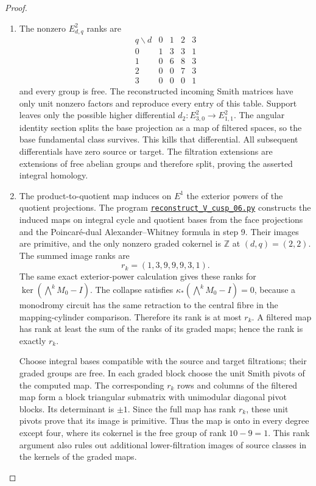 \begin{proof}
\begin{enumerate}[label={$\langle1\rangle$\arabic*.}]
\item The nonzero $E^2_{d,q}$ ranks are
\[
\begin{array}{c|rrrr}
q\backslash d&0&1&2&3\\\hline
0&1&3&3&1\\
1&0&6&8&3\\
2&0&0&7&3\\
3&0&0&0&1
\end{array}
\]
and every group is free. The reconstructed incoming Smith matrices
have only unit nonzero factors and reproduce every entry of this table.
Support leaves only the possible higher differential
$d_2:E^2_{3,0}\to E^2_{1,1}$.
The angular identity section splits the base projection as a map of
filtered spaces, so the base fundamental class survives.  This kills
that differential.  All subsequent differentials have zero source or
target.  The filtration extensions are extensions of free abelian
groups and therefore split, proving the asserted integral homology.

\item The product-to-quotient map induces on $E^1$ the exterior powers of
the quotient projections.  The program \href{https://github.com/KokunoYumeto/s6-complex-structure-workbench/blob/83d76022bcd442278b760db9ff438afceed6c6ea/pro_returns/S6_SERIES_GRIND_checkpoint_10_20261120T0211Z/code/current_audits/audit_corrections/code/reconstruct_V_cusp_06.py}{\texttt{reconstruct\_V\_cusp\_06.py}} constructs the induced maps
on integral cycle and quotient bases from the face projections and the
Poincar\'e-dual Alexander--Whitney formula in step 9. Their images are primitive, and the only nonzero graded cokernel
is $\mathbb Z$ at $(d,q)=(2,2)$.  The summed image ranks are
\[
             r_k=(1,3,9,9,9,3,1).
\]
The same exact exterior-power calculation gives these ranks for
$\ker(\bigwedge^kM_0-I)$.
The collapse satisfies
$\kappa_*(\bigwedge^kM_0-I)=0$, because a monodromy circuit
has the same retraction to the central fibre in the mapping-cylinder
comparison.  Therefore its rank is at most $r_k$.
A filtered map has rank at least the sum of the ranks of its
graded maps; hence the rank is exactly $r_k$.

Choose integral bases compatible with the source and target
filtrations; their graded groups are free.  In each graded block
choose the unit Smith pivots of the computed map.  The corresponding
$r_k$ rows and columns of the filtered map form a block
triangular submatrix with unimodular diagonal pivot blocks.
Its determinant is $\pm1$.  Since the full map has rank $r_k$,
these unit pivots prove that its image is primitive.
Thus the map is onto in every degree except four, where its
cokernel is the free group of rank $10-9=1$.
This rank argument also rules out additional lower-filtration images
of source classes in the kernels of the graded maps.


\end{enumerate}
\end{proof}
